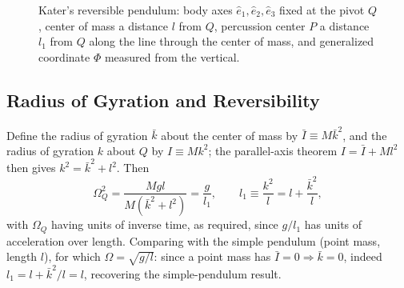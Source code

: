 \documentclass[11pt]{article}
\newcommand{\Om}{\Omega}
\begin{document}
\begin{figure}[htb]
\centering
{}
\caption{Kater's reversible pendulum: body axes $\hat e_1,\hat e_2,\hat e_3$ fixed at the pivot $Q$, center of mass a distance $l$ from $Q$, percussion center $P$ a distance $l_1$ from $Q$ along the line through the center of mass, and generalized coordinate $\Phi$ measured from the vertical.}
\label{fig:katers}
\end{figure}

\subsection{Radius of Gyration and Reversibility}

Define the radius of gyration $\bar k$ about the center of mass by $\bar I\equiv M\bar k^2$, and the radius of gyration $k$ about $Q$ by $I\equiv Mk^2$; the parallel-axis theorem $I=\bar I+Ml^2$ then gives $k^2=\bar k^2+l^2$. Then
\begin{equation}
\Om_Q^2 = \frac{Mgl}{M(\bar k^2+l^2)} = \frac{g}{l_1}, \qquad l_1\equiv\frac{k^2}{l}=l+\frac{\bar k^2}{l},
\label{eq:kater-l1}
\end{equation}
with $\Om_Q$ having units of inverse time, as required, since $g/l_1$ has units of acceleration over length. Comparing with the simple pendulum (point mass, length $l$), for which $\Om=\sqrt{g/l}$: since a point mass has $\bar I=0\Rightarrow\bar k=0$, indeed $l_1=l+\bar k^2/l=l$, recovering the simple-pendulum result.
\end{document}
